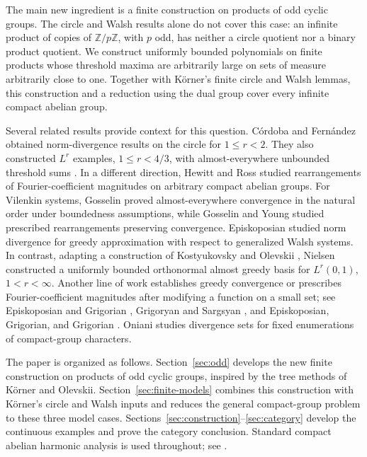 \documentclass[11pt]{amsart}
\theoremstyle{definition}
\theoremstyle{remark}
\begin{document}
The main new ingredient is a finite construction on products
of odd cyclic groups. The circle and Walsh results alone do not
cover this case: an infinite product of copies of
\(\mathbb Z/p\mathbb Z\), with \(p\) odd, has neither a circle
quotient nor a binary product quotient. We construct uniformly
bounded polynomials on finite products whose threshold maxima are
arbitrarily large on sets of measure arbitrarily close to one.
Together with K\"orner's finite circle and Walsh lemmas, this construction
and a reduction using the dual group cover every infinite compact
abelian group.

Several related results provide context for this question.
C\'ordoba and Fern\'andez \cite[Theorem~1]{CF98} obtained
norm-divergence results on the circle for \(1\leq r<2\).
They also constructed \(L^r\) examples, \(1\leq r<4/3\),
with almost-everywhere unbounded threshold sums
\cite[Section~5, pp.~1137--1138]{CF98}.
In a different direction, Hewitt and Ross \cite{HR74} studied
rearrangements of Fourier-coefficient magnitudes on arbitrary compact
abelian groups. For Vilenkin systems,
Gosselin \cite{G73} proved almost-everywhere convergence in the natural
order under boundedness assumptions, while Gosselin and Young
\cite{GY75} studied prescribed rearrangements preserving convergence.
Episkoposian \cite{E11} studied norm divergence for greedy approximation
with respect to generalized Walsh systems. In contrast, adapting a
construction of Kostyukovsky and Olevskii \cite{KO97}, Nielsen \cite{N07}
constructed a uniformly bounded orthonormal almost greedy basis for
\(L^r(0,1)\), \(1<r<\infty\). Another line of work establishes greedy
convergence or prescribes Fourier-coefficient magnitudes after modifying a
function on a small set; see Episkoposian and Grigorian \cite{EG12},
Grigoryan and Sargsyan \cite{GS18}, and Episkoposian, Grigorian, and
Grigorian \cite{EGG24}. Oniani \cite{O22} studies divergence sets for fixed
enumerations of compact-group characters. 

The paper is organized as follows. Section~\ref{sec:odd}
develops the new finite construction on products of odd cyclic groups,
inspired by the tree methods of K\"orner and Olevskii.
Section~\ref{sec:finite-models} combines this construction with
K\"orner's circle and Walsh inputs and reduces the general
compact-group problem to these three model cases.
Sections~\ref{sec:construction}--\ref{sec:category} develop the
continuous examples and prove the category conclusion. Standard
compact abelian harmonic analysis is used throughout; see \cite{Rudin}.
\end{document}
